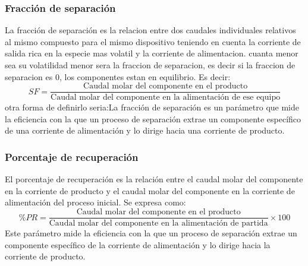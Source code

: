\documentclass{report}
\begin{document}
\subsubsection{Fracción de separación}
\begin{raggedright}
	La fracción de separación es la relacion entre dos caudales individuales relativos al mismo compuesto para el mismo dispositivo teniendo en cuenta la corriente de salida rica en la especie mas volatil y la corriente de alimentacion.
	cuanta menor sea su volatilidad menor sera la fraccion de separacion, es decir si la fraccion de separacion es 0, los componentes estan en equilibrio. Es decir:\\
	
	\begin{equation*}
		SF =\frac{\text{Caudal molar del componente en el producto}}{\text{Caudal molar del componente en la alimentación de ese equipo}}
	\end{equation*}
	otra forma de definirlo seria:La fracción de separación es un parámetro que mide la eficiencia con la que un proceso de separación extrae un componente específico de una corriente de alimentación y lo dirige hacia una corriente de producto.
\end{raggedright}
\subsubsection{Porcentaje de recuperación}
\begin{raggedright}
    El porcentaje de recuperación es la relación entre el caudal molar del componente en la corriente de producto y el caudal molar del componente en la corriente de alimentación del proceso inicial. Se expresa como:
    \begin{equation*}
        \%PR = \frac{\text{Caudal molar del componente en el producto}}{\text{Caudal molar del componente en la alimentación de partida}} \times 100
    \end{equation*}
    Este parámetro mide la eficiencia con la que un proceso de separación extrae un componente específico de la corriente de alimentación y lo dirige hacia la corriente de producto.

\end{raggedright}
\end{document}

